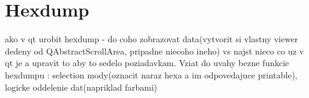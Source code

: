 \section{Hexdump}
ako v qt urobit hexdump - do coho zobrazovat data(vytvorit si vlastny viewer dedeny od QAbstractScrollArea, pripadne niecoho ineho) vs najst nieco co uz v qt je a upravit to aby to sedelo poziadavkam. Vziat do uvahy bezne funkcie hexdumpu : selection mody(oznacit naraz hexa a im odpovedajuce printable), logicke oddelenie dat(napriklad farbami)








